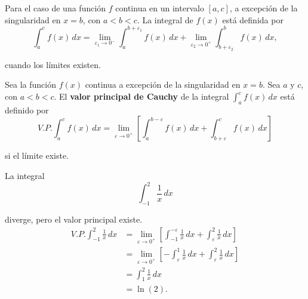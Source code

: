 Para el caso de una función $f$ continua en un intervalo $[a,c]$, a excepción de la singularidad en $x = b$, con $a< b < c$. La integral de $f(x)$ está definida por
$$\int_a^c f(x) \,dx = \lim_{\varepsilon_1 \to 0^-} \int_a^{b + \varepsilon_1} f(x) \,dx+ \lim_{\varepsilon_2 \to 0^+} \int_{b + \varepsilon_2}^b f(x) \,dx,$$

cuando los límites existen. 

\begin{defi}
Sea la función $f(x)$ continua a excepción de la singularidad en $x = b$. Sea $a$ y $c$, con $a < b< c$. El \textbf{valor principal de Cauchy} de la integral $\int_a^c f(x)\,dx$ está definido por
$$V.P. \int_{a}^{c} f(x) \,dx = \lim_{\varepsilon \to 0^+} \left[ \int_a^{b-\varepsilon} f(x) \,dx + \int_{b + \varepsilon}^c f(x) \,dx \right]$$

si el límite existe.
\end{defi}

\begin{ejemplo}
    La integral
    $$\int_{-1}^2 \frac{1}{x} \,dx$$

    diverge, pero el valor principal existe.
    \begin{align*}
        V.P. \int_{-1}^2 \frac{1}{x} \,dx &=  \lim_{\varepsilon \to 0^+} \left[ \int_{-1}^{-\varepsilon} \frac{1}{x} \,dx + \int_{ \varepsilon}^2 \frac{1}{x} \,dx \right] \\
        &= \lim_{\varepsilon \to 0^+} \left[ -\int_{\varepsilon}^{1} \frac{1}{x} \,dx + \int_{ \varepsilon}^2 \frac{1}{x} \,dx \right] \\
        &= \int_1^2 \frac{1}{x} \,dx \\
        &= \ln(2).
    \end{align*}
\end{ejemplo}